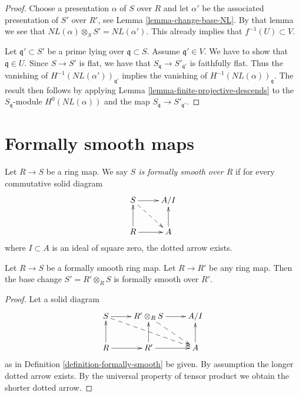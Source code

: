 \begin{proof}
Choose a presentation $\alpha$ of $S$ over $R$ and
let $\alpha'$ be the associated presentation of $S'$
over $R'$, see Lemma \ref{lemma-change-base-NL}.
By that lemma we see that
$NL(\alpha) \otimes_S S' = NL(\alpha')$.
This already implies that $f^{-1}(U) \subset V$.

\medskip\noindent
Let $\mathfrak q' \subset S'$ be a prime lying over
$\mathfrak q \subset S$. Assume $\mathfrak q' \in V$.
We have to show that $\mathfrak q \in U$.
Since $S \to S'$ is flat,
we have that $S_{\mathfrak q} \to S'_{\mathfrak q'}$
is faithfully flat. Thus the vanishing of
$H^{-1}(NL(\alpha'))_{\mathfrak q'}$ implies the
vanishing of $H^{-1}(NL(\alpha))_{\mathfrak q}$.
The result then follows by applying
Lemma \ref{lemma-finite-projective-descends}
to the $S_{\mathfrak q}$-module $H^0(NL(\alpha))$
and the map $S_{\mathfrak q} \to S'_{\mathfrak q'}$.
\end{proof}










\section{Formally smooth maps}
\label{section-formally-smooth}

\begin{definition}
\label{definition-formally-smooth}
Let $R \to S$ be a ring map.
We say {\it $S$ is formally smooth over $R$} if for every
commutative solid diagram
$$
\xymatrix{
S \ar[r] \ar@{-->}[rd] & A/I \\
R \ar[r] \ar[u] & A \ar[u]
}
$$
where $I \subset A$ is an ideal of square zero, the dotted
arrow exists.
\end{definition}

\begin{lemma}
\label{lemma-base-change-fs}
Let $R \to S$ be a formally smooth ring map.
Let $R \to R'$ be any ring map.
Then the base change $S' = R' \otimes_R S$ is formally smooth over $R'$.
\end{lemma}

\begin{proof}
Let a solid diagram
$$
\xymatrix{
S \ar[r] \ar@{-->}[rrd] & R' \otimes_R S \ar[r] \ar@{-->}[rd] & A/I \\
R  \ar[u] \ar[r] & R' \ar[r] \ar[u] & A \ar[u]
}
$$
as in Definition \ref{definition-formally-smooth} be given.
By assumption the longer dotted arrow exists. By the universal
property of tensor product we obtain the shorter dotted arrow.
\end{proof}

